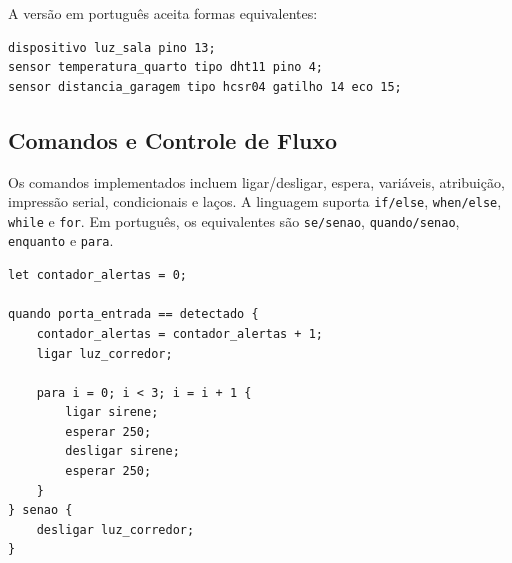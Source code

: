 \documentclass[conference]{IEEEtran}
\begin{document}
A versão em português aceita formas equivalentes:

\begin{lstlisting}[style=homescript]
dispositivo luz_sala pino 13;
sensor temperatura_quarto tipo dht11 pino 4;
sensor distancia_garagem tipo hcsr04 gatilho 14 eco 15;
\end{lstlisting}

\subsection{Comandos e Controle de Fluxo}
Os comandos implementados incluem ligar/desligar, espera, variáveis, atribuição, impressão serial, condicionais e laços. A linguagem suporta \texttt{if/else}, \texttt{when/else}, \texttt{while} e \texttt{for}. Em português, os equivalentes são \texttt{se/senao}, \texttt{quando/senao}, \texttt{enquanto} e \texttt{para}.

\begin{lstlisting}[style=homescript,caption={Trecho de automação residencial completa.},label={lst:complete}]
let contador_alertas = 0;

quando porta_entrada == detectado {
    contador_alertas = contador_alertas + 1;
    ligar luz_corredor;

    para i = 0; i < 3; i = i + 1 {
        ligar sirene;
        esperar 250;
        desligar sirene;
        esperar 250;
    }
} senao {
    desligar luz_corredor;
}
\end{lstlisting}
\end{document}
